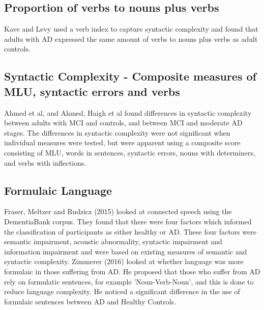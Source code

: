 \documentclass[12pt]{article}
\begin{document}
\subsection{Proportion of verbs to nouns plus verbs}
Kave and Levy used a verb index to capture syntactic complexity and found that adults with AD expressed the same amount of verbs to nouns plus verbs as adult controls. \newline
\par 
\subsection{Syntactic Complexity - Composite measures of MLU, syntactic errors and verbs}
Ahmed et al, and Ahmed, Haigh et al found differences in syntactic complexity between adults with MCI and controls, and between MCI and moderate AD stages. The differences in syntactic complexity were not significant when individual measures were tested, but were apparent using a composite score consisting of MLU, words in sentences, syntactic errors, nouns with determiners, and verbs with inflections. \newline
\par 
\subsection{Formulaic Language}
Fraser, Meltzer and Rudzicz (2015) \cite{Fraser2015} looked at connected speech using the DementiaBank corpus. They found that there were four factors which informed the classification of participants as either healthy or AD. These four factors were semantic impairment, acoustic abnormality, syntactic impairment and information impairment and were based on existing measures of semantic and syntactic complexity. Zimmerer (2016) \cite{Zimmerer2016} looked at whether language was more formulaic in those suffering from AD. He proposed that those who suffer from AD rely on formulatic sentences, for example 'Noun-Verb-Noun', and this is done to reduce language complexity. He noticed a significant difference in the use of formulaic sentences between AD and Healthy Controls. \newline
\end{document}
